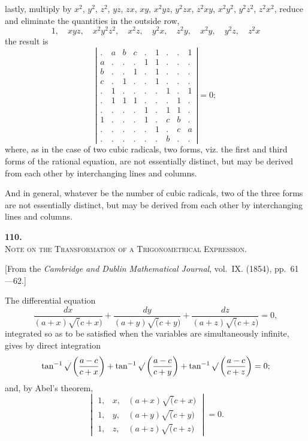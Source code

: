 \documentclass[11pt,a4paper]{book}
\begin{document}
lastly, multiply by $x^2$, $y^2$, $z^2$, $yz$, $zx$, $xy$, $x^2yz$, $y^2zx$, $z^2xy$, $x^2y^2$, $y^2z^2$, $z^2x^2$, reduce and eliminate the quantities in the outside row,
\[
1, \quad xyz, \quad x^2y^2z^2, \quad x^2z, \quad y^2x, \quad z^2y, \quad x^2y, \quad y^2z, \quad z^2x
\]
the result is
\[
\left|\begin{array}{ccc|ccc|ccc}
. & a & b & c & . & 1 & . & . & 1 \\
a & . & . & . & 1 & 1 & . & . & . \\
b & . & . & 1 & . & 1 & . & . & . \\
c & . & 1 & . & . & 1 & . & . & . \\
\hline
. & 1 & . & . & . & . & 1 & . & 1 \\
. & 1 & 1 & 1 & . & . & . & 1 & . \\
. & . & . & . & 1 & . & 1 & 1 & . \\
\hline
1 & . & . & . & 1 & . & c & b & . \\
. & . & . & . & . & 1 & . & c & a \\
. & . & . & . & . & . & b & . & .
\end{array}\right| = 0;
\]
where, as in the case of two cubic radicals, two forms, viz. the first and third forms of the rational equation, are not essentially distinct, but may be derived from each other by interchanging lines and columns.

And in general, whatever be the number of cubic radicals, two of the three forms are not essentially distinct, but may be derived from each other by interchanging lines and columns.


\newpage
\setcounter{page}{45}

\begin{center}
{\Large\bfseries 110.}\\[0.5em]
{\large\scshape Note on the Transformation of a Trigonometrical Expression.}
\end{center}
\vspace{0.3em}
\begin{center}
\small [From the \textit{Cambridge and Dublin Mathematical Journal}, vol.~IX. (1854), pp.~61---62.]
\end{center}
\vspace{0.5em}

The differential equation
\[
\frac{dx}{(a+x)\surd(c+x)} + \frac{dy}{(a+y)\surd(c+y)} + \frac{dz}{(a+z)\surd(c+z)} = 0,
\]
integrated so as to be satisfied when the variables are simultaneously infinite, gives by direct integration
\[
\tan^{-1}\surd\left(\frac{a-c}{c+x}\right) + \tan^{-1}\surd\left(\frac{a-c}{c+y}\right) + \tan^{-1}\surd\left(\frac{a-c}{c+z}\right) = 0;
\]
and, by Abel's theorem,
\[
\begin{vmatrix}
1, & x, & (a+x)\surd(c+x) \\
1, & y, & (a+y)\surd(c+y) \\
1, & z, & (a+z)\surd(c+z)
\end{vmatrix} = 0.
\]
\end{document}
